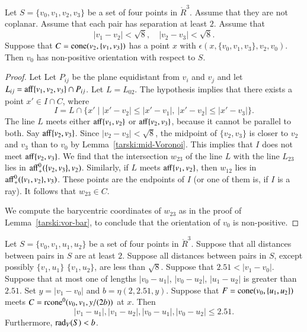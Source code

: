 \newpage

\begin{lemma}
Let $S=\{v_0,v_1,v_2,v_3\}$ be a set of four points in $\ring{R}^3$.
Assume that they are not coplanar.
Assume that each pair has separation at least $2$.
Assume that 
$$
|v_1-v_2|<\sqrt8,\quad  |v_2-v_3|<\sqrt8.
$$
Suppose that
$C={\operatorname{cone}}(v_2,\{v_1,v_3\})$ has a point $x$ with 
  $\epsilon(x,\{v_0,v_1,v_3\},v_2,v_0)$.    
Then $v_0$ has non-positive orientation with respect to $S$.
\end{lemma}



\begin{proof} 
Let Let $P_{ij}$ be the plane equidistant from $v_i$ and
$v_j$ and let $L_{ij} = {\operatorname{aff}}\{v_1,v_2,v_3\}\cap P_{ij}$.
Let $L=L_{02}$.
The hypothesis implies that there exists a point 
$x'\in I \cap C$, where
   $$I= L\cap \{x'\mid |x'-v_2|\le|x'-v_1|,\ |x'-v_2|\le |x'-v_3|\}.$$  
The line $L$ meets either ${\operatorname{aff}}\{v_1,v_2\}$ or ${\operatorname{aff}}\{v_2,v_3\}$,
because it cannot be parallel to both.  Say ${\operatorname{aff}}\{v_2,v_3\}$.
Since $|v_2-v_3|<\sqrt8$, the midpoint of $\{v_2,v_3\}$ is closer
to $v_2$ and $v_3$ than to $v_0$ by Lemma~\ref{tarski:mid-Voronoi}.
This implies that $I$ does not meet ${\operatorname{aff}}\{v_2,v_3\}$.
We find that the intersection $w_{23}$ of the line $L$ with
the line $L_{23}$ lies in ${\operatorname{aff}}_+^0(\{v_2,v_3\},v_2)$.  Similarly,
if $L$ meets ${\operatorname{aff}}\{v_1,v_2\}$, then $w_{12}$ lies in
${\operatorname{aff}}_+^0(\{v_1,v_2\},v_3)$.  These points are the endpoints of 
$I$ (or one of them is, if $I$ is a ray).  It follows that $w_{23}\in C$.

We compute the barycentric coordinates of $w_{23}$ as in the proof
of Lemma~\ref{tarski:vor-bar}, to conclude that the orientation
of $v_0$ is non-positive.
\end{proof}

\newpage

\begin{lemma}
 Let $S=\{v_0,v_1,u_1,u_2\}$ be a set of four points
in $\ring{R}^3$.  
Suppose that all distances between pairs in $S$ are at least $2$.
Suppose all distances between pairs in $S$, except possibly $\{v_1,u_1\}$
$\{v_1,u_2\}$, are
less than $\sqrt8$. Suppose that $2.51 < |v_1-v_0|$.
Suppose that at most one of lengths $|v_0-u_1|$,
$|v_0-u_2|$, $|u_1-u_2|$ is greater than $2.51$.
%
Set $y=|v_1-v_0|$ and $b=\eta(2,2.51,y)$.
Suppose that $F={\operatorname{cone}}(v_0,\{u_1,u_2\})$ meets
$C={\operatorname{rcone}}^0(v_0,v_1,y/(2b))$ at $x$.
Then 
  $$
  |v_1-u_1|,|v_1-u_2|,|v_0-u_1|,|v_0-u_2|\le 2.51.
  $$
Furthermore, $\operatorname{rad}_V(S) < b$. 
\end{lemma}

